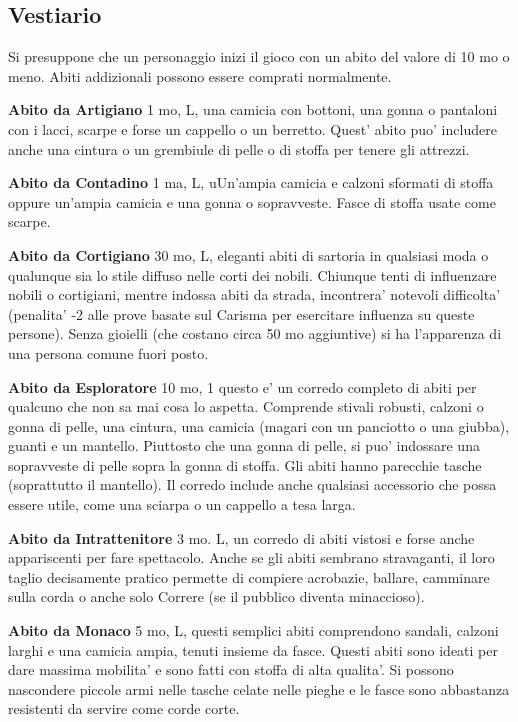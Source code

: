 \documentclass[a4paper,11pt,twoside,openany]{book}
\begin{document}
{\pagebreak

\subsection{Vestiario}

\label{vestiario}

Si presuppone che un personaggio inizi il gioco con un abito del valore di 10 mo o meno. Abiti addizionali possono essere comprati normalmente.

\textbf{Abito da Artigiano} 1 mo, L, una camicia con bottoni, una gonna o pantaloni con i lacci, scarpe e forse un cappello o un berretto. Quest' abito puo' includere anche una cintura o un grembiule di pelle o di stoffa per tenere gli attrezzi.

\textbf{Abito da Contadino} 1 ma, L, uUn'ampia camicia e calzoni sformati di stoffa oppure un'ampia camicia e una gonna o sopravveste. Fasce di stoffa usate come scarpe.

\textbf{Abito da Cortigiano} 30 mo, L, eleganti abiti di sartoria in qualsiasi moda o qualunque sia lo stile diffuso nelle corti dei nobili. Chiunque tenti di influenzare nobili o cortigiani, mentre indossa abiti da strada, incontrera' notevoli difficolta' (penalita' -2 alle prove basate sul Carisma per esercitare influenza su queste persone). Senza gioielli (che costano circa 50 mo aggiuntive) si ha l'apparenza di una persona comune fuori posto.

\textbf{Abito da Esploratore} 10 mo, 1 questo e' un corredo completo di abiti per qualcuno che non sa mai cosa lo aspetta. Comprende stivali robusti, calzoni o gonna di pelle, una cintura, una camicia (magari con un panciotto o una giubba), guanti e un mantello. 
Piuttosto che una gonna di pelle, si puo' indossare una sopravveste di pelle sopra la gonna di stoffa. Gli abiti hanno parecchie tasche (soprattutto il mantello). Il corredo include anche qualsiasi accessorio che possa essere utile, come una sciarpa o un cappello a tesa larga.

\textbf{Abito da Intrattenitore} 3 mo. L,  un corredo di abiti vistosi e forse anche appariscenti per fare spettacolo. Anche se gli abiti sembrano stravaganti, il loro taglio decisamente pratico permette di compiere acrobazie, ballare, camminare sulla corda o anche solo Correre (se il pubblico diventa minaccioso).

\textbf{Abito da Monaco} 5 mo, L, questi semplici abiti comprendono sandali, calzoni larghi e una camicia ampia, tenuti insieme da fasce. Questi abiti sono ideati per dare massima mobilita' e sono fatti con stoffa di alta qualita'. Si possono nascondere piccole armi nelle tasche celate nelle pieghe e le fasce sono abbastanza resistenti da servire come corde corte.

}
\end{document}
